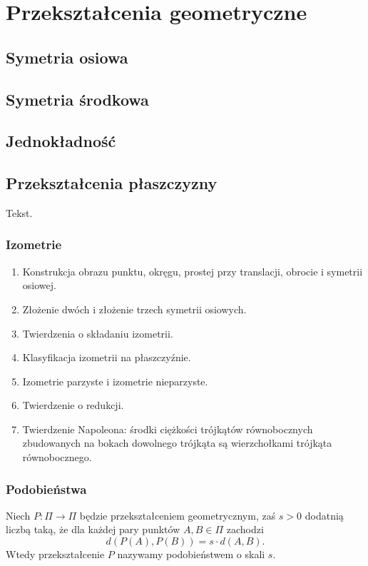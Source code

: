 \section{Przekształcenia geometryczne}
\subsection{Symetria osiowa}
\subsection{Symetria środkowa}
\subsection{Jednokładność}

%

\subsection{Przekształcenia płaszczyzny}
Tekst.

\subsubsection{Izometrie}

\begin{enumerate}
\item Konstrukcja obrazu punktu, okręgu, prostej przy translacji, obrocie i symetrii osiowej.
\item Złożenie dwóch i złożenie trzech symetrii osiowych.
\item Twierdzenia o składaniu izometrii.
\item Klasyfikacja izometrii na płaszczyźnie.
\item Izometrie parzyste i izometrie nieparzyste.
\item Twierdzenie o redukcji.
\item Twierdzenie Napoleona: środki ciężkości trójkątów równobocznych zbudowanych na bokach dowolnego trójkąta są wierzchołkami trójkąta równobocznego.
\end{enumerate}

\subsubsection{Podobieństwa}
\begin{definition}[podobieństwo]
    Niech $P \colon \Pi \to \Pi$ będzie przekształceniem geometrycznym, zaś $s > 0$ dodatnią liczbą taką, że dla każdej pary punktów $A, B \in \Pi$ zachodzi
    \begin{equation}
        d(P(A), P(B)) = s \cdot d(A, B).
    \end{equation}
    Wtedy przekształcenie $P$ nazywamy podobieństwem o skali $s$.
\end{definition}

